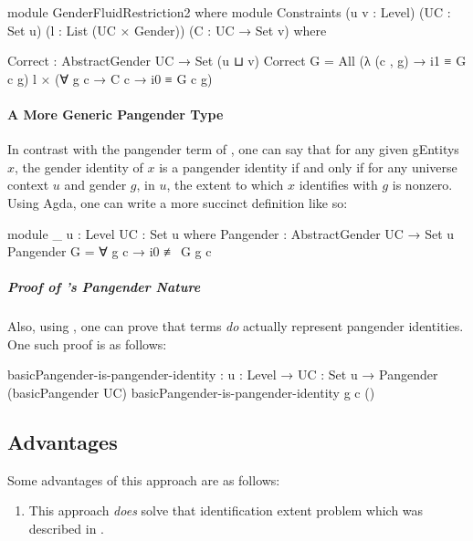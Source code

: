\documentclass{article}
\theoremstyle{remark}
\begin{document}
\begin{code}
    module GenderFluidRestriction2 where
      module Constraints
             (u v : Level)
             (UC : Set u)
             (l : List (UC × Gender))
             (C : UC → Set v) where

        Correct : AbstractGender UC → Set (u ⊔ v)
        Correct G = All (λ (c , g) → i1 ≡ G c g) l
                  × (∀ g c → C c → i0 ≡ G c g)
\end{code}

\paragraph{A More Generic Pangender Type}
In contrast with the pangender term of , one can say that for any given \glspl{gEntity} \(x\), the gender identity of \(x\) is a pangender identity if and only if for any universe context \(u\) and gender \(g\), in \(u\), the extent to which \(x\) identifies with \(g\) is nonzero.  Using Agda, one can write a more succinct definition like so:

\begin{code}
    module _ {u : Level} {UC : Set u} where
      Pangender : AbstractGender UC → Set u
      Pangender G = ∀ g c → i0 ≢ G g c
\end{code}

\subparagraph{Proof of 's Pangender Nature}
Also, using , one can prove that  terms \emph{do} actually represent pangender identities.  One such proof is as follows:

\begin{code}
    basicPangender-is-pangender-identity :
      {u : Level} → {UC : Set u} → Pangender (basicPangender UC)
    basicPangender-is-pangender-identity g c ()
\end{code}

\subsection{Advantages}
Some advantages of this approach are as follows:

\begin{enumerate}
  \item This approach \emph{does} solve that identification extent problem which was described in .\label{enum:gender8advantageExtent}
\end{enumerate}
\end{document}
